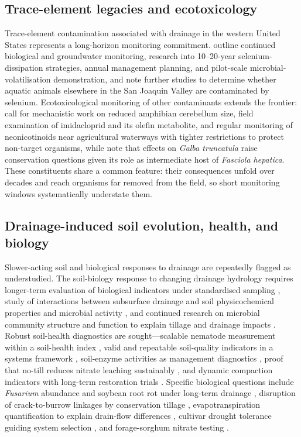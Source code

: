\subsection{Trace-element legacies and ecotoxicology}

Trace-element contamination associated with drainage in the western United States
represents a long-horizon monitoring commitment. \textcite{BENSON1993} outline
continued biological and groundwater monitoring, research into 10--20-year
selenium-dissipation strategies, annual management planning, and pilot-scale
microbial-volatilisation demonstration, and \textcite{SAIKI1987} note further
studies to determine whether aquatic animals elsewhere in the San Joaquin Valley
are contaminated by selenium. Ecotoxicological monitoring of other contaminants
extends the frontier: \textcite{Campbell2023} call for mechanistic work on
reduced amphibian cerebellum size, field examination of imidacloprid and its
olefin metabolite, and regular monitoring of neonicotinoids near agricultural
waterways with tighter restrictions to protect non-target organisms, while
\textcite{Dreyfuss2018} note that effects on \textit{Galba truncatula} raise
conservation questions given its role as intermediate host of \textit{Fasciola
hepatica}. These constituents share a common feature: their consequences unfold
over decades and reach organisms far removed from the field, so short monitoring
windows systematically understate them.

\subsection{Drainage-induced soil evolution, health, and biology}

Slower-acting soil and biological responses to drainage are repeatedly flagged as
understudied. The soil-biology response to changing drainage hydrology requires
longer-term evaluation of biological indicators under standardised sampling
\parencite{Sherbine2023}, study of interactions between subsurface drainage and
soil physicochemical properties and microbial activity \parencite{Yang2025}, and
continued research on microbial community structure and function to explain
tillage and drainage impacts \parencite{Kaur2024b,Kumar2014}. Robust soil-health
diagnostics are sought---scalable nematode measurement within a soil-health index
\parencite{Li2023b}, valid and repeatable soil-quality indicators in a systems
framework \parencite{Nakajima2015}, soil-enzyme activities as management
diagnostics \parencite{Singh2007}, proof that no-till reduces nitrate leaching
sustainably \parencite{Masri2024}, and dynamic compaction indicators with
long-term restoration trials \parencite{Caron2025}. Specific biological questions
include \textit{Fusarium} abundance and soybean root rot under long-term drainage
\parencite{Han2017}, disruption of crack-to-burrow linkages by conservation
tillage \parencite{Shipitalo2004}, evapotranspiration quantification to explain
drain-flow differences \parencite{Daigh2014}, cultivar drought tolerance guiding
system selection \parencite{DarziNaftchali2017b}, and forage-sorghum nitrate
testing \parencite{Nash2017}.


